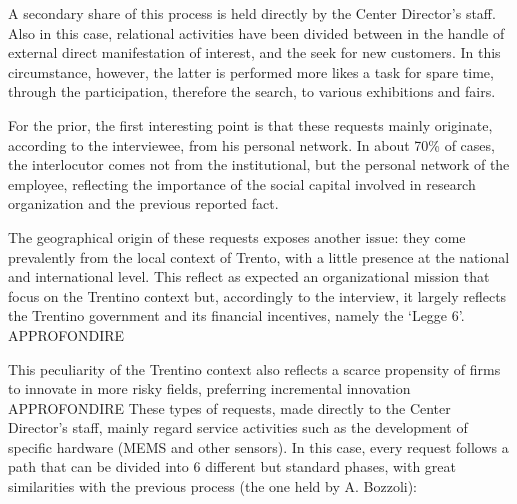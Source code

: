 A secondary share of this process is held directly by the Center Director’s staff. Also in this case, relational activities have been divided between in the handle of external direct manifestation of interest, and the seek for new customers. In this circumstance, however, the latter is performed more likes a task for spare time, through the participation, therefore the search, to various exhibitions and fairs.

For the prior, the first interesting point is that these requests mainly originate, according to the interviewee, from his personal network. In about 70\% of cases, the interlocutor comes not from the institutional, but the personal network of the employee, reflecting the importance of the social capital involved in research organization and the previous reported fact. 

The geographical origin of these requests exposes another issue: they come prevalently from the local context of Trento, with a little presence at the national and international level. This reflect as expected an organizational mission that focus on the Trentino context but, accordingly to the interview, it largely reflects the Trentino government and its financial incentives, namely the ‘Legge 6’. 
 APPROFONDIRE 

This peculiarity of the Trentino context also reflects a scarce propensity of firms to innovate in more risky fields, preferring incremental innovation APPROFONDIRE
These types of requests, made directly to the Center Director’s staff, mainly regard service activities such as the development of specific hardware (MEMS and other sensors). In this case, every request follows a path that can be divided into 6 different but standard phases, with great similarities with the previous process (the one held by A. Bozzoli): 

